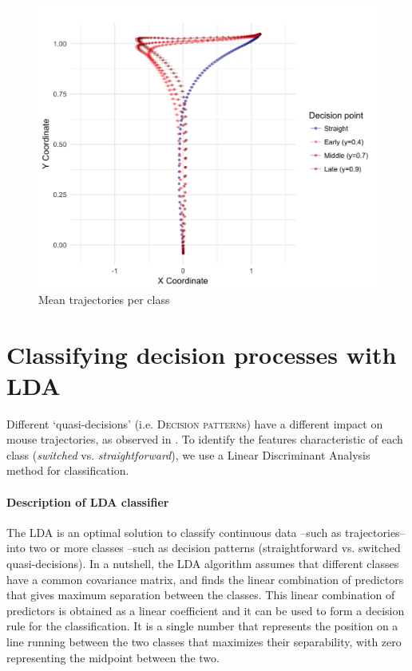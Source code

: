 \documentclass{article}
\begin{document}
\begin{figure}
\centering
\includegraphics[width=\textwidth]{calibration_mean_trajectory_pointchang.png}
\caption{Mean trajectories per class}\label{fig:mean.trajectories.calibration}
\end{figure}

\section{Classifying decision processes with LDA}
\label{section:LDA}
Different `quasi-decisions' (i.e. \textsc{Decision pattern}s) have a different impact on mouse trajectories, as observed in . To identify the features characteristic of each class (\textit{switched} vs. \textit{straightforward}), we use a Linear Discriminant Analysis method for classification. 

\paragraph{Description of LDA classifier}
The LDA is an optimal solution to classify continuous data --such as trajectories-- into two or more classes --such as decision patterns (straightforward vs. switched quasi-decisions). In a nutshell, the LDA algorithm assumes that different classes have a common covariance matrix, and finds the linear combination of predictors that gives maximum separation between the classes. This linear combination of predictors is obtained as a linear coefficient and it can be used to form a decision rule for the classification.  It is a single number that represents the position  on a line running between the two classes that maximizes their separability, with zero representing the midpoint between the two.
 
\end{document}
